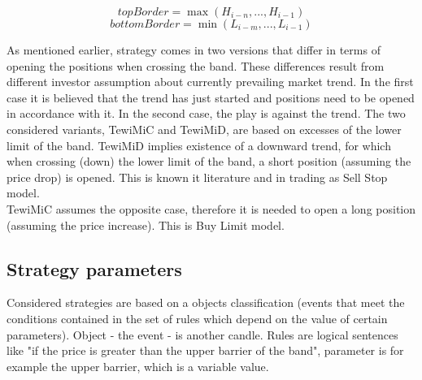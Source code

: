 \documentclass{tewiart}
\begin{document}
\begin{equation}
topBorder = \max{(H_{i-n},...,H_{i-1})}
\end{equation}
\begin{equation}
bottomBorder = \min{(L_{i-m},...,L_{i-1})}
\end{equation}

As mentioned earlier, strategy comes in two versions that differ in terms of opening the positions when crossing the band. These differences result from different investor assumption about currently prevailing market trend. In the first case it is believed that the trend has just started and positions need to be opened in accordance with it. In the second case, the play is against the trend. The two considered variants, TewiMiC and TewiMiD, are based on excesses of the lower limit of the band. TewiMiD implies existence of a downward trend, for which when crossing (down) the lower limit of the band, a short position (assuming the price drop) is opened. This is known it literature and in trading as Sell Stop model. \\

TewiMiC assumes the opposite case, therefore it is needed to open a long position (assuming the price increase).  This is Buy Limit model.

\subsection{Strategy parameters}
Considered strategies are based on a objects classification (events that meet the conditions contained in the set of rules which depend on the  value of certain parameters). Object - the event - is another candle. Rules are logical sentences like "if the price is greater than the upper barrier of the band", parameter is for example the upper barrier, which is a variable value. \\
\end{document}
